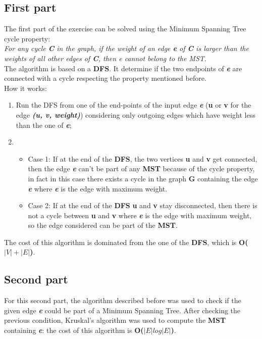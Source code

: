 \documentclass[11pt]{article}
\begin{document}
\subsection{First part}
The first part of the exercise can be solved using the Minimum Spanning Tree cycle property: \\
\textit{For any cycle \textbf{C} in the graph,
if the weight of an edge \textbf{e} of \textbf{C} is larger than the weights of all other
edges of \textbf{C}, then e cannot belong to the MST}.
\\
The algorithm is based on a \textbf{DFS}. It determine if the
two endpoints of \textit{\textbf{e}} are connected with a cycle respecting the property
mentioned before. \\
How it works:
\begin{enumerate}
	\item Run the DFS from one of the end-points of the
input edge \textit{\textbf{e}} (\textbf{u} or \textbf{v} for the edge \textit{\textbf{(u, v, weight)}}) considering only outgoing edges which
have weight less than the one of \textit{\textbf{e}};
	\item \begin{itemize}
		\item Case 1: If at the end of the \textbf{DFS}, the two vertices \textbf{u} and \textbf{v}
get connected, then the edge \textit{\textbf{e}} can't be part of any \textbf{MST}
because of the cycle property, in fact in this case there exists
a cycle in the graph \textbf{G} containing the edge \textit{\textbf{e}} where \textit{\textbf{e}} is the
edge with maximum weight.
		\item Case 2: If at the end of the \textbf{DFS} \textbf{u} and
\textbf{v} stay disconnected, then there is not a cycle between \textbf{u} and
\textbf{v} where \textit{\textbf{e}} is the edge with maximum weight, so the edge
considered can be part of the \textbf{MST}.
	\end{itemize}
\end{enumerate}
The cost of this algorithm is dominated from the one of the \textbf{DFS}, which
is \textbf{O($|V| + |E|$)}.

\subsection{Second part}
For this second part, the algorithm described before was used to check if
the given edge \textit{\textbf{e}} could be part of a Minimum Spanning Tree. After
checking the previous condition, Kruskal’s algorithm was used to compute
the \textbf{MST} containing \textit{\textbf{e}}: the cost of this algorithm is
\textbf{O($|E|log|E|$)}.
\end{document}
